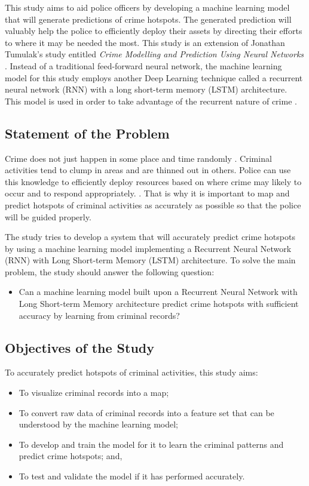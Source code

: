     This study aims to aid police officers by developing a machine learning model that will generate predictions of crime hotspots. The generated prediction will valuably help the police to efficiently deploy their assets by directing their efforts to where it may be needed the most. This study is an extension of Jonathan Tumulak's study entitled \textit{Crime Modelling and Prediction Using Neural Networks} \cite{tumulak2015crime}. Instead of a traditional feed-forward neural network, the machine learning model for this study employs another Deep Learning technique called a recurrent neural network (RNN) with a long short-term memory (LSTM) architecture. This model is used in order to take advantage of the recurrent nature of crime \cite{perc2013understanding}.

\subsection{Statement of the Problem} \label{section:statement-of-the-problem}
    Crime does not just happen in some place and time randomly \cite{brantingham2005modeling}. Criminal activities tend to clump in areas and are thinned out in others. Police can use this knowledge to efficiently deploy resources based on where crime may likely to occur and to respond appropriately. \cite{eck2005mapping}. That is why it is important to map and predict hotspots of criminal activities as accurately as possible so that the police will be guided properly.

    The study tries to develop a system that will accurately predict crime hotspots by using a machine learning model implementing a Recurrent Neural Network (RNN) with Long Short-term Memory (LSTM) architecture. To solve the main problem, the study should answer the following question:
        \begin{itemize}
        \item Can a machine learning model built upon a Recurrent Neural Network with Long Short-term Memory architecture predict crime hotspots with sufficient accuracy by learning from criminal records?
        \end{itemize}

\subsection{Objectives of the Study} \label{section:objectives-of-the-study}
    To accurately predict hotspots of criminal activities, this study aims:
        \begin{itemize}
        \item To visualize criminal records into a map;
        \item To convert raw data of criminal records into a feature set that can be understood by the machine learning model;
        \item To develop and train the model for it to learn the criminal patterns and predict crime hotspots; and,
        \item To test and validate the model if it has performed accurately.
        \end{itemize}

